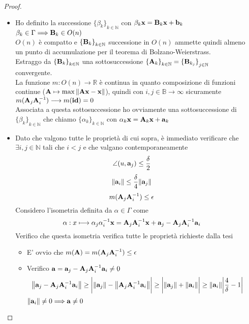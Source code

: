 \documentclass[10pt,a4paper]{article}
\begin{document}
\begin{proof}
\begin{itemize}
\item Ho definito la successione ${ \{\beta_k \}}_{k \in \mathbb{N}}$  con  $\beta_k \vb{x = B}_k \vb{x + b}_k$   $\beta_k \in \Gamma \Longrightarrow \vb{B}_k \in O(n)$  \\
$O(n)$  è compatto e ${ \{\vb{B}_k \} }_{k \in \mathbb{N}}$ successione in  $O(n)$  ammette quindi almeno un punto di accumulazione per il teorema di Bolzano-Weierstrass. \\
Estraggo da ${ \{ \vb{B}_k \}}_{k \in \mathbb{N}}$  una sottosuccessione  $ { \{ \vb{A}_k \} }_{k \in \mathbb{N}} = { \{ \vb{B}_{k_j} \} }_{j \in \mathbb{N}}$  convergente.  \\
La funzione  $ m: O(n) \longrightarrow \mathbb{R}$  è continua in quanto composizione di funzioni continue ($ \vb{A} \mapsto \max{\norm{\vb{Ax-x}}} $), quindi con $i,j \in \mathbb{B} \longrightarrow \infty $ sicuramente $m(\vb{A}_j \vb{A}^{-1}_i) \longrightarrow m(\vb{id}) = 0 $ \\
Associata a questa sottosuccessione ho ovviamente una sottosuccessione di ${ \{\beta_k \}}_{k \in \mathbb{N}}$ che chiamo ${ \{\alpha_k \}}_{k \in \mathbb{N}}$ con  $\alpha_k \vb{x = A}_k \vb{x + a}_k$ 
\item Dato che valgono tutte le proprietà di cui sopra, è immediato verificare che $\exists i,j \in \mathbb{N} $  tali che  $ i < j$  e che valgano contemporaneamente
\[ \angle(u, \vb{a}_j ) \leq \frac{\delta}{2} \]
\[ \norm{\vb{a}_i} \leq \frac{\delta}{4}\norm{\vb{a}_j} \]
\[ m( \vb{A}_j \vb{A}^{-1}_i ) \leq \epsilon \]
Considero l'isometria definita da $\alpha \in \Gamma$ come 
\[ \alpha : x \longmapsto \alpha_j \alpha^{-1}_i \vb{x} = \vb{A}_j \vb{A}^{-1}_i \vb{x} + \vb{a}_j - \vb{A}_j \vb{A}^{-1}_i \vb{a}_i\]
Verifico che questa isometria verifica tutte le proprietà richieste dalla tesi

\begin{itemize}
\item E' ovvio che $m(\vb{A}) = m(\vb{A}_j \vb{A}^{-1}_i) \leq \epsilon$ 
\item Verifico  $\vb{a}= \vb{a}_j - \vb{A}_j \vb{A}^{-1}_i \vb{a}_i \neq 0$ 
\[ \norm{\vb{a}_j - \vb{A}_j \vb{A}^{-1}_i \vb{a}_i} \geq \bigg| \norm{\vb{a}_j} - \norm{ \vb{A}_j \vb{A}^{-1}_i \vb{a}_i } \bigg| \geq \bigg| \norm{\vb{a}_j } + \norm{\vb{a}_i} \bigg| \geq \norm{\vb{a}_i} \bigg| \frac{4}{\delta} -1 \bigg| \]
$\norm{\vb{a}_i} \neq 0 \Longrightarrow \vb{a} \neq 0$
 

\end{itemize}
\end{itemize}
\end{proof}
\end{document}
